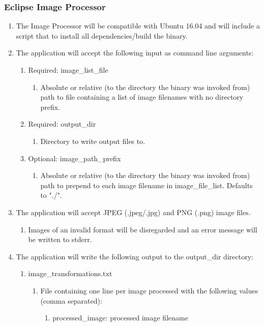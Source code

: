 \documentclass[10pt, onecolumn, draftclsnofoot, letterpaper, compsoc]{IEEEtran}
\begin{document}
\subsubsection{Eclipse Image Processor}
	\begin{enumerate}
		\item The Image Processor will be compatible with Ubuntu 16.04 and
		 will include a script that to install all dependencies/build the 
		 binary.

		 \item The application will accept the following input as command line
		 arguments:
		 \begin{enumerate}
		 	\item Required: image\_list\_file
		 		\begin{enumerate}
		 			\item Absolute or relative (to the directory the binary was 
		 			invoked from) path to file containing a list of image filenames 
		 			with no directory prefix.
		 		\end{enumerate}

		 	\item Required: output\_dir
		 		\begin{enumerate}
		 			\item Directory to write output files to.
		 		\end{enumerate}

		 	\item Optional: image\_path\_prefix
		 		\begin{enumerate}
		 			\item Absolute or relative (to the directory the binary was
		 			 invoked from) path to prepend to each image filename in 
		 			 image\_file\_list. Defaults to "./".
		 		\end{enumerate}
		 \end{enumerate}

		 \item The application will accept JPEG (.jpeg/.jpg) and PNG (.png) 
		 image files.
		 \begin{enumerate}
		 	\item Images of an invalid format will be disregarded and an error
		 	 message will be written to stderr.
		 \end{enumerate}

		 \item The application will write the following output to the 
		 output\_dir directory:
		 \begin{enumerate}
		 	\item image\_transformations.txt
		 	\begin{enumerate}
		 		\item File containing one line per image processed with the 
		 		following values (comma separated):
		 		\begin{enumerate}
		 			\item processed\_image: processed image filename


\end{enumerate}
\end{enumerate}
\end{enumerate}
\end{enumerate}
\end{document}

